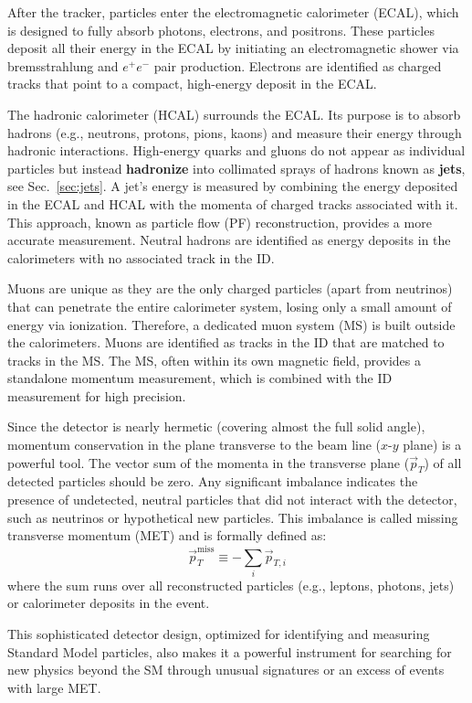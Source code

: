 After the tracker, particles enter the electromagnetic calorimeter (ECAL), which is designed to fully absorb photons, electrons, and positrons. These particles deposit all their energy in the ECAL by initiating an electromagnetic shower via bremsstrahlung and $e^{+}e^{-}$ pair production. Electrons are identified as charged tracks that point to a compact, high-energy deposit in the ECAL.

The hadronic calorimeter (HCAL) surrounds the ECAL. Its purpose is to absorb hadrons (e.g., neutrons, protons, pions, kaons) and measure their energy through hadronic interactions. High-energy quarks and gluons do not appear as individual particles but instead \textbf{hadronize} into collimated sprays of hadrons known as \textbf{jets}, see Sec.~\ref{sec:jets}. A jet's energy is measured by combining the energy deposited in the ECAL and HCAL with the momenta of charged tracks associated with it. This approach, known as particle flow (PF) reconstruction, provides a more accurate measurement. Neutral hadrons are identified as energy deposits in the calorimeters with no associated track in the ID.

Muons are unique as they are the only charged particles (apart from neutrinos) that can penetrate the entire calorimeter system, losing only a small amount of energy via ionization. Therefore, a dedicated muon system (MS) is built outside the calorimeters. Muons are identified as tracks in the ID that are matched to tracks in the MS. The MS, often within its own magnetic field, provides a standalone momentum measurement, which is combined with the ID measurement for high precision.

Since the detector is nearly hermetic (covering almost the full solid angle), momentum conservation in the plane transverse to the beam line ($x$-$y$ plane) is a powerful tool. The vector sum of the momenta in the transverse plane ($\vec{p}_T$) of all detected particles should be zero. Any significant imbalance indicates the presence of undetected, neutral particles that did not interact with the detector, such as neutrinos or hypothetical new particles. This imbalance is called missing transverse momentum (MET) and is formally defined as:
$$
\vec{p}_T^{\text{miss}} \equiv -\sum_i \vec{p}_{T,i}
$$
where the sum runs over all reconstructed particles (e.g., leptons, photons, jets) or calorimeter deposits in the event.

This sophisticated detector design, optimized for identifying and measuring Standard Model particles, also makes it a powerful instrument for searching for new physics beyond the SM through unusual signatures or an excess of events with large MET.


